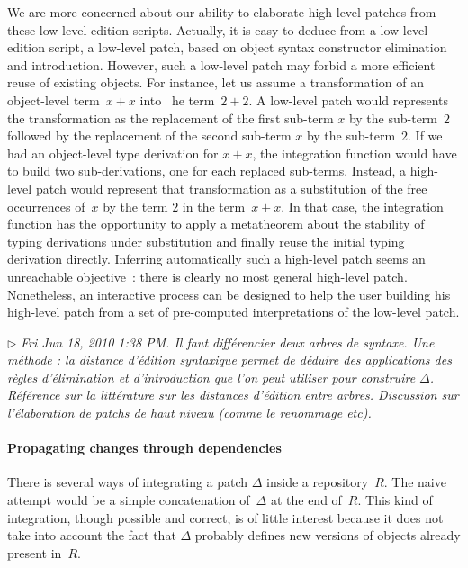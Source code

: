 \documentclass{article}
\newcommand{\remtext}[1]{\textcolor{bwgreen}{$\triangleright$ \textsl{#1}}}
\begin{document}
We are more concerned about our ability to elaborate high-level patches
from these low-level edition scripts. Actually, it is easy to deduce
from a low-level edition script, a low-level patch, based on object
syntax constructor elimination and introduction. However, such a
low-level patch may forbid a more efficient reuse of existing
objects. For instance, let us assume a transformation of an
object-level term~$x + x$ into~ he term~$2 + 2$. A low-level patch
would represents the transformation as the replacement of the first
sub-term $x$ by the sub-term~$2$ followed by the replacement of the
second sub-term $x$ by the sub-term~$2$. If we had an object-level type
derivation for $x + x$, the integration function would have to build
two sub-derivations, one for each replaced sub-terms.  Instead, a
high-level patch would represent that transformation as a substitution
of the free occurrences of~$x$ by the term $2$ in the term~$x + x$. In
that case, the integration function has the opportunity to apply a
metatheorem about the stability of typing derivations under
substitution and finally reuse the initial typing derivation
directly. Inferring automatically such a high-level patch seems an
unreachable objective~: there is clearly no most general high-level
patch. Nonetheless, an interactive process can be designed to help the
user building his high-level patch from a set of pre-computed
interpretations of the low-level patch.

\remtext{Fri Jun 18, 2010 1:38 PM. Il faut différencier deux arbres de
  syntaxe. Une méthode : la distance d'édition syntaxique permet de
  déduire des applications des règles d'élimination et d'introduction
  que l'on peut utiliser pour construire $\Delta$. Référence sur la
  littérature sur les distances d'édition entre arbres. Discussion sur
  l'élaboration de patchs de haut niveau (comme le renommage etc). }

\paragraph{Propagating changes through dependencies}
\-

There is several ways of integrating a patch $\Delta$ inside a
repository~$R$.  The naive attempt would be a simple concatenation
of~$\Delta$ at the end of~$R$.  This kind of integration, though
possible and correct, is of little interest because it does not take
into account the fact that $\Delta$ probably defines new versions of
objects already present in~$R$.
\end{document}
